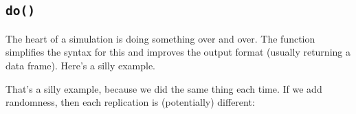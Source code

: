 \subsection{\texttt{do()}}
The heart of a simulation is doing something over and over.  
The  function simplifies the syntax for this and improves 
the output format (usually returning a data frame).
Here's a silly example.
\begin{knitrout}
\end{knitrout}

That's a silly example, because we did the same thing each time.  If we add randomness, then
each replication is (potentially) different:
\begin{knitrout}
\end{knitrout}


